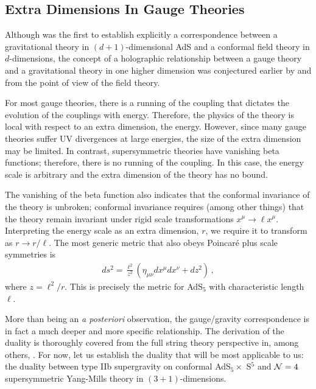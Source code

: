 \documentclass[../PhD.tex]{subfiles}
\begin{document}

\subsection{Extra Dimensions In Gauge Theories}
\label{ssec: extra dims in gauge theories}

Although \cite{hep-th/9711200} was the first to establish explicitly a correspondence between a gravitational theory in $(d+1)$-dimensional AdS and a conformal field theory in $d$-dimensions, the concept of a holographic relationship between a gauge theory and a gravitational theory in one higher dimension was conjectured earlier by \cite{gr-qc/9310026} and \cite{hep-th/9409089} from the point of view of the field theory. 

For most gauge theories, there is a running of the coupling that dictates the evolution of the couplings with energy. Therefore, the physics of the theory is local with respect to an extra dimension, the energy. However, since many gauge theories suffer UV divergences at large energies, the size of the extra dimension may be limited. In contrast, supersymmetric theories have vanishing beta functions; therefore, there is no running of the coupling. In this case, the energy scale is arbitrary and the extra dimension of the theory has no bound.

The vanishing of the beta function also indicates that the conformal invariance of the theory is unbroken; conformal invariance requires (among other things) that the theory remain invariant under rigid scale transformations $x^\mu \to \ell x^\mu$. Interpreting the energy scale as an extra dimension, $r$, we require it to transform as $r \to r/ \ell$. The most generic metric that also obeys Poincar\'e plus scale symmetries is
\begin{align}
\label{Poincare ads}
ds^2 = \frac{\ell^2}{z^2} \left( \eta_{\mu \nu}dx^\mu dx^\nu +dz^2 \right) \, ,
\end{align}
where $z = \ell^2 / r$. This is precisely the metric for AdS$_5$ with characteristic length $\ell$. 

More than being an \emph{a posteriori} observation, the gauge/gravity correspondence is in fact a much deeper and more specific relationship. The derivation of the duality is thoroughly covered from the full string theory perspective in, among others, \cite{hep-th/9711200, gr-qc/0602037, 1501.00007, hep-th/9902131, hep-th/9905111}. For now, let us establish the duality that will be most applicable to us: the duality between type IIb supergravity on conformal AdS$_5 \times$ S$^5$ and $\mathcal N = 4$ supersymmetric Yang-Mills theory in $(3+1)$-dimensions.
\end{document}
